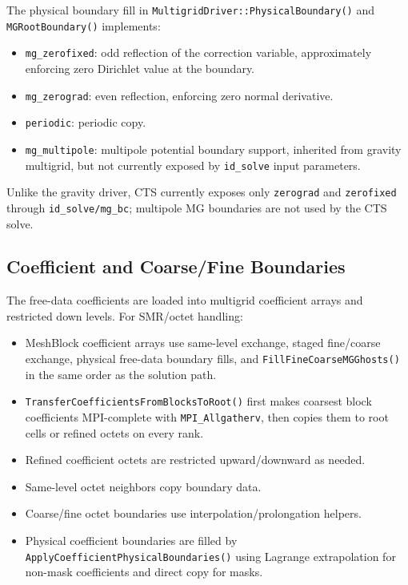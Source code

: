 \documentclass[11pt]{article}
\newcommand{\code}[1]{\texttt{#1}}
\begin{document}
The physical boundary fill in \code{MultigridDriver::PhysicalBoundary()} and
\code{MGRootBoundary()} implements:
\begin{itemize}
  \item \code{mg\_zerofixed}: odd reflection of the correction variable,
        approximately enforcing zero Dirichlet value at the boundary.
  \item \code{mg\_zerograd}: even reflection, enforcing zero normal derivative.
  \item \code{periodic}: periodic copy.
  \item \code{mg\_multipole}: multipole potential boundary support, inherited
        from gravity multigrid, but not currently exposed by \code{id\_solve}
        input parameters.
\end{itemize}

Unlike the gravity driver, CTS currently exposes only \code{zerograd} and
\code{zerofixed} through \code{id\_solve/mg\_bc}; multipole MG boundaries are not
used by the CTS solve.

\subsection{Coefficient and Coarse/Fine Boundaries}

The free-data coefficients are loaded into multigrid coefficient arrays and
restricted down levels.  For SMR/octet handling:
\begin{itemize}
  \item MeshBlock coefficient arrays use same-level exchange, staged
        fine/coarse exchange, physical free-data boundary fills, and
        \code{FillFineCoarseMGGhosts()} in the same order as the solution path.
  \item \code{TransferCoefficientsFromBlocksToRoot()} first makes coarsest block
        coefficients MPI-complete with \code{MPI\_Allgatherv}, then copies them
        to root cells or refined octets on every rank.
  \item Refined coefficient octets are restricted upward/downward as needed.
  \item Same-level octet neighbors copy boundary data.
  \item Coarse/fine octet boundaries use interpolation/prolongation helpers.
  \item Physical coefficient boundaries are filled by
        \code{ApplyCoefficientPhysicalBoundaries()} using Lagrange extrapolation
        for non-mask coefficients and direct copy for masks.
\end{itemize}
\end{document}
